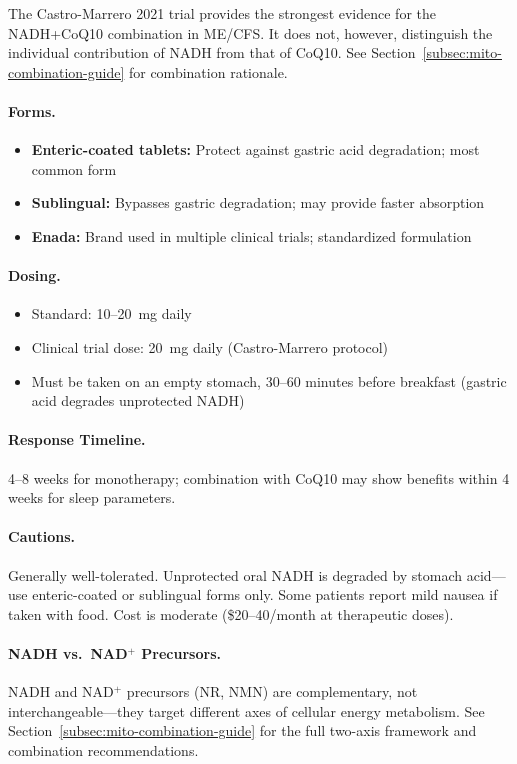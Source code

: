 The Castro-Marrero 2021 trial provides the strongest evidence for the NADH+CoQ10 combination in ME/CFS. It does not, however, distinguish the individual contribution of NADH from that of CoQ10. See Section~\ref{subsec:mito-combination-guide} for combination rationale.

\paragraph{Forms.}
\begin{itemize}
    \item \textbf{Enteric-coated tablets:} Protect against gastric acid degradation; most common form
    \item \textbf{Sublingual:} Bypasses gastric degradation; may provide faster absorption
    \item \textbf{Enada:} Brand used in multiple clinical trials; standardized formulation
\end{itemize}

\paragraph{Dosing.}
\begin{itemize}
    \item Standard: 10--20~mg daily
    \item Clinical trial dose: 20~mg daily (Castro-Marrero protocol)
    \item Must be taken on an empty stomach, 30--60 minutes before breakfast (gastric acid degrades unprotected NADH)
\end{itemize}

\paragraph{Response Timeline.} 4--8 weeks for monotherapy; combination with CoQ10 may show benefits within 4 weeks for sleep parameters.

\paragraph{Cautions.} Generally well-tolerated. Unprotected oral NADH is degraded by stomach acid---use enteric-coated or sublingual forms only. Some patients report mild nausea if taken with food. Cost is moderate (\$20--40/month at therapeutic doses).

\paragraph{NADH vs.\ NAD$^+$ Precursors.} NADH and NAD$^+$ precursors (NR, NMN) are complementary, not interchangeable---they target different axes of cellular energy metabolism. See Section~\ref{subsec:mito-combination-guide} for the full two-axis framework and combination recommendations.

